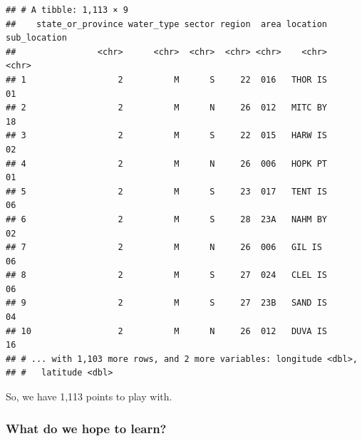 \documentclass[]{book}
\theoremstyle{definition}
\theoremstyle{definition}
\theoremstyle{remark}
\begin{document}
\begin{verbatim}
## # A tibble: 1,113 × 9
##    state_or_province water_type sector region  area location sub_location
##                <chr>      <chr>  <chr>  <chr> <chr>    <chr>        <chr>
## 1                  2          M      S     22  016   THOR IS           01
## 2                  2          M      N     26  012   MITC BY           18
## 3                  2          M      S     22  015   HARW IS           02
## 4                  2          M      N     26  006   HOPK PT           01
## 5                  2          M      S     23  017   TENT IS           06
## 6                  2          M      S     28  23A   NAHM BY           02
## 7                  2          M      N     26  006   GIL IS            06
## 8                  2          M      S     27  024   CLEL IS           06
## 9                  2          M      S     27  23B   SAND IS           04
## 10                 2          M      N     26  012   DUVA IS           16
## # ... with 1,103 more rows, and 2 more variables: longitude <dbl>,
## #   latitude <dbl>
\end{verbatim}

So, we have 1,113 points to play with.

\subsubsection{What do we hope to
learn?}\label{what-do-we-hope-to-learn}
\end{document}

